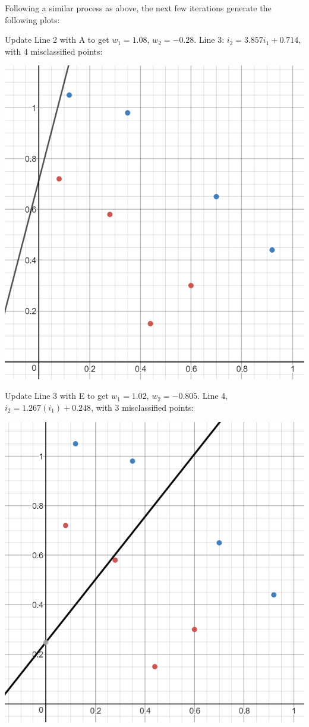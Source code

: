 \documentclass[12pt, letterpaper]{article}
\begin{document}
	\medskip 
	Following a similar process as above, the next few iterations generate the following plots:
	
	Update Line 2 with A to get $w_1 = 1.08$, $w_2 = -0.28$. Line 3: $i_2 = 3.857i_1 + 0.714$, with 4 misclassified points:
	\medskip

	\includegraphics[scale=0.6]{"Problem 4/Line 3"}
	
	\medskip 	
	Update Line 3 with E to get $w_1 = 1.02$, $w_2 = -0.805$. Line 4, $i_2 = 1.267(i_1) + 0.248$, with 3 misclassified points:
	\medskip

	\includegraphics[scale=0.6]{"Problem 4/Line 4"}
	
\end{document}
